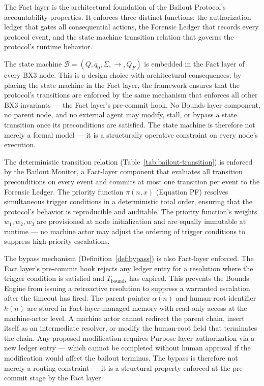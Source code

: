 The Fact layer is the architectural foundation of the Bailout Protocol's
accountability properties.  It enforces three distinct functions: the
authorization ledger that gates all consequential actions, the Forensic Ledger
that records every protocol event, and the state machine transition relation
that governs the protocol's runtime behavior.

The state machine $\mathcal{B} = (Q, q_0, \Sigma, \rightarrow, Q_F)$ is embedded
in the Fact layer of every BX3 node.  This is a design choice with architectural
consequences: by placing the state machine in the Fact layer, the framework
ensures that the protocol's transitions are enforced by the same mechanism that
enforces all other BX3 invariants — the Fact layer's pre-commit hook.  No Bounds
layer component, no parent node, and no external agent may modify, stall, or
bypass a state transition once its preconditions are satisfied.  The state
machine is therefore not merely a formal model — it is a structurally operative
constraint on every node's execution.

The deterministic transition relation (Table~\ref{tab:bailout-transition}) is
enforced by the Bailout Monitor, a Fact-layer component that evaluates all
transition preconditions on every event and commits at most one transition per
event to the Forensic Ledger.  The priority function $\pi(n, x)$ (Equation PF)
resolves simultaneous trigger conditions in a deterministic total order,
ensuring that the protocol's behavior is reproducible and auditable.  The
priority function's weights $w_1, w_2, w_3$ are provisioned at node initialization
and are equally immutable at runtime — no machine actor may adjust the ordering
of trigger conditions to suppress high-priority escalations.

The bypass mechanism (Definition~\ref{def:bypass}) is also Fact-layer enforced.
The Fact layer's pre-commit hook rejects any ledger entry for a resolution
where the trigger condition is satisfied and $T_{\text{bounds}}$ has expired.
This prevents the Bounds Engine from issuing a retroactive resolution to
suppress a warranted escalation after the timeout has fired.  The parent pointer
$\alpha(n)$ and human-root identifier $h(n)$ are stored in Fact-layer-managed
memory with read-only access at the machine-actor level.  A machine actor cannot
redirect the parent chain, insert itself as an intermediate resolver, or modify
the human-root field that terminates the chain.  Any proposed modification
requires Purpose layer authorization via a new ledger entry — which cannot be
completed without human approval if the modification would affect the bailout
terminus.  The bypass is therefore not merely a routing constraint — it is a
structural property enforced at the pre-commit stage by the Fact layer.

